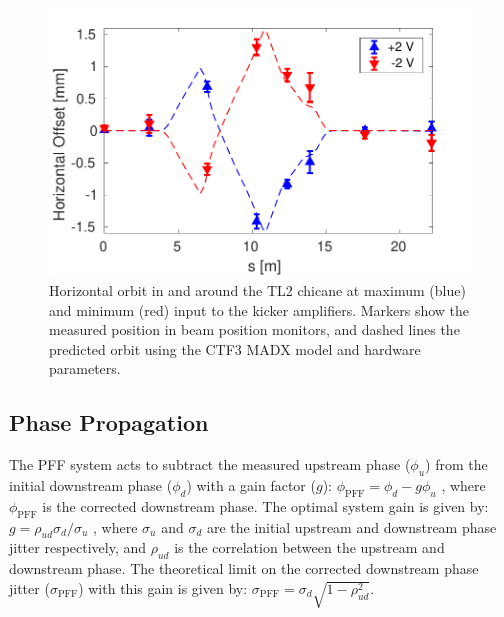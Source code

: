 \documentclass[%
 reprint,
 amsmath,amssymb,
 prl,
]{revtex4-1}
\begin{document}
\begin{figure}
	\includegraphics[width=\columnwidth]{figs/orbClos}
	\caption{\label{fig:orbClos}Horizontal orbit in and around the TL2 chicane 
	at maximum (blue) and 
	minimum (red) 
	input to the kicker amplifiers. Markers show the measured position in beam 
	position monitors, and dashed lines the predicted orbit using the 
	CTF3 MADX model and hardware parameters.}
\end{figure}


\subsection{\label{ss:r56} Phase Propagation}

The PFF system acts to subtract the measured upstream phase (\(\phi_u\)) from 
the initial downstream phase (\(\phi_d\)) with a gain factor (\(g\)):
\(\phi_{\mathrm{PFF}} = \phi_d - g\phi_u\)
, where \(\phi_{\mathrm{PFF}}\) is the corrected downstream phase. The optimal 
system gain is given by:
\(g = \rho_{ud} \sigma_d/\sigma_u\)
, where \(\sigma_u\) and \(\sigma_d\) are the initial upstream and downstream 
phase jitter respectively, and \(\rho_{ud}\) is the correlation between the 
upstream and downstream phase. The theoretical limit on the corrected 
downstream phase jitter (\(\sigma_{\mathrm{PFF}}\)) with this gain is given by:
\(\sigma_{\mathrm{PFF}}=\sigma_d \sqrt{1-\rho_{ud}^2}\). 
\end{document}
